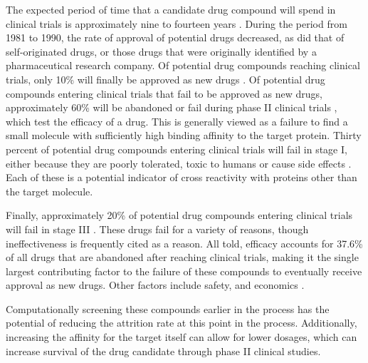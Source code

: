 The expected period of time that a candidate drug compound will spend in clinical trials is approximately nine to fourteen years \cite{dimasi2003price,paul2010improve}.
During the period from 1981 to 1990, the rate of approval of potential drugs decreased, as did that of self-originated drugs, or those drugs that were originally identified by a pharmaceutical research company.
Of potential drug compounds reaching clinical trials, only 10\% will finally be approved as new drugs \cite{dimasi2001risks,paul2010improve}.
Of potential drug compounds entering clinical trials that fail to be approved as new drugs, approximately 60\% will be abandoned or fail during phase II clinical trials \cite{dimasi2001risks}, which test the efficacy of a drug.
This is generally viewed as a failure to find a small molecule with sufficiently high binding affinity to the target protein.
Thirty percent of potential drug compounds entering clinical trials will fail in stage I, either because they are poorly tolerated, toxic to humans or cause side effects \cite{dimasi2001risks}.
Each of these is a potential indicator of cross reactivity with proteins other than the target molecule.

Finally, approximately 20\% of potential drug compounds entering clinical trials will fail in stage III \cite{dimasi2001risks}.
These drugs fail for a variety of reasons, though ineffectiveness is frequently cited as a reason.
All told, efficacy accounts for 37.6\% of all drugs that are abandoned after reaching clinical trials, making it the single largest contributing factor to the failure of these compounds to eventually receive approval as new drugs.
Other factors include safety, and economics \cite{dimasi2001risks}.

Computationally screening these compounds earlier in the process has the potential of reducing the attrition rate at this point in the process.
Additionally, increasing the affinity for the target itself can allow for lower dosages, which can increase survival of the drug candidate through phase II clinical studies.

